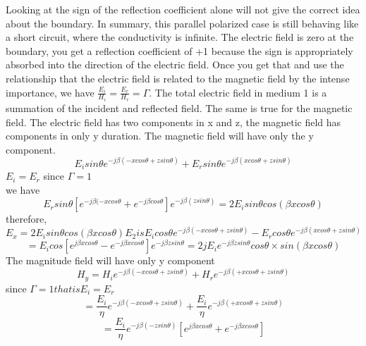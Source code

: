 Looking at the sign of the reflection coefficient alone will not give the correct idea about the boundary. In summary, this parallel polarized case is still behaving like a short circuit, where the conductivity is infinite. The electric field is zero at the boundary, you get a reflection coefficient of +1 because the sign is appropriately absorbed into the direction of the electric field. Once you get that and use the relationship that the electric field is related to the magnetic field by the intense importance, we have $\frac{E_{i}}{H_{i}} = \frac{E_{r}}{H_{r}} =\Gamma$. The total electric field in medium 1 is a summation of the incident and reflected field. The same is true for the magnetic field. The electric field has two components in x and z, the magnetic field has components in only y duration. The magnetic field will have only the y component.
\begin{equation*}
E_{i}sin\theta e^{-j\beta(-xcos\theta + zsin\theta)} + E_{r}sin\theta e^{-j\beta(xcos\theta + zsin\theta)}
\end{equation*}
$E_{i} =E_{r}$    since $\Gamma =1$\\
we have
\begin{dmath*}
E_{r}sin\theta [e^{-j\beta(-xcos\theta} + e^{-j\beta cos\theta}] e^{-j\beta(zsin\theta)} = 2E_{i}sin\theta cos(\beta xcos\theta)
\end{dmath*}
therefore,
\begin{dmath*}
E_x = 2E_{i}sin\theta cos(\beta xcos\theta)
E_{2} is E_{i}cos\theta e^{-j\beta(-xcos\theta + zsin\theta)} - E_{r}cos\theta e^{-j\beta(xcos\theta + zsin\theta)} 
\end{dmath*}
\begin{dmath*}
= E_{i}cos[e^{j\beta xcos\theta} - e^{-j\beta xcos\theta}]e^{-j\beta zsin\theta}
=2jE_{i}e^{-j\beta zsin\theta} cos\theta \times sin(\beta xcos\theta)
\end{dmath*}
The magnitude field will have only y component
\begin{equation*}
H_{y} = H_{i}e^{-j\beta(-xcos\theta + zsin\theta)} + H_{r}e^{-j\beta(+xcos\theta + zsin\theta)}
\end{equation*}
since $\Gamma = 1 that is E_{i}=E_{r}$
\begin{equation*}
= \frac{E_{i}}{\eta} e^{-j\beta(-xcos\theta + zsin\theta)} + \frac{E_{i}}{\eta}e^{-j\beta(+xcos\theta + zsin\theta)}
\end{equation*}
\begin{equation*}
=\frac{E_{i}}{\eta} e^{-j\beta(-zsin\theta)} [e^{j\beta xcos\theta} + e^{-j\beta xcos\theta}]
\end{equation*}
